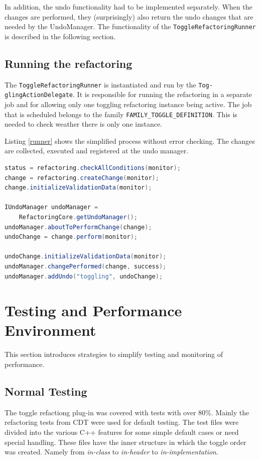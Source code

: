 In addition, the undo functionality had to be implemented separately. When the 
changes are performed, they (surprisingly) also return the undo changes that are 
needed by the UndoManager. The functionality of the 
\texttt{ToggleRefactoringRunner} is described in the following section.

\subsection{Running the refactoring}\label{runnersec}
The \texttt{ToggleRefactoringRunner} is instantiated and run by the 
\texttt{Tog- glingActionDelegate}. It is responsible for running the refactoring 
in a separate job and for allowing only one toggling refactoring instance being
active. The job that is scheduled belongs to the family
\texttt{FAMILY\_TOGGLE\_DEFINITION}. This is needed to check weather there is
only one instance.

Listing \ref{runner} shows the simplified process without error checking. The 
changes are collected, executed and registered at the undo manager.

\begin{lstlisting}[caption={running the refactoring},label={runner},language=java]
status = refactoring.checkAllConditions(monitor);
change = refactoring.createChange(monitor);
change.initializeValidationData(monitor);

IUndoManager undoManager = 
    RefactoringCore.getUndoManager();
undoManager.aboutToPerformChange(change);
undoChange = change.perform(monitor);

undoChange.initializeValidationData(monitor);
undoManager.changePerformed(change, success);
undoManager.addUndo("toggling", undoChange);
\end{lstlisting}

\section{Testing and Performance Environment}

This section introduces strategies to simplify testing and monitoring of 
performance.

\subsection{Normal Testing}

The toggle refactiong plug-in was covered with tests with over 80\%. Mainly the
refactoring tests from CDT were used for default testing. The test files were
divided into the various C++ features for some simple default cases or need
special handling. These files have the inner structure in which the toggle order
was created. Namely from \textit{in-class} to \textit{in-header} to
\textit{in-implementation}.

